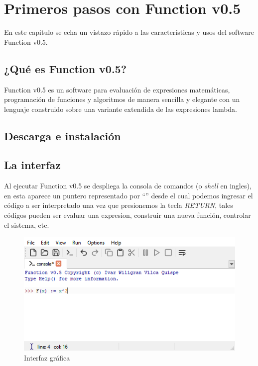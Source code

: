 
\chapter{Primeros pasos con Function v0.5}
   En este capitulo se echa un vistazo rápido a las características y usos del software Function v0.5.
   
   \section{¿Qué es Function v0.5?}
      Function v0.5 es un software para evaluación de expresiones matemáticas, programación de funciones y algoritmos de manera sencilla y elegante con un lenguaje construido sobre una variante extendida de las expresiones lambda.%
      
   \section{Descarga e instalación}
   
   \section{La interfaz}
      Al ejecutar Function v0.5 se despliega la consola de comandos (o {\it shell} en ingles), en esta aparece un puntero representado por ``\arrowprompter'' desde el cual podemos ingresar el código a ser interpretado una vez que presionemos la tecla {\it RETURN}, tales códigos pueden ser evaluar una expresion, construir una nueva función, controlar el sistema, etc. 
   
      \begin{figure}[htbp]
         \caption{Interfaz gráfica}\label{fg:console}
         \begin{center}
            \includegraphics[scale=2.5]{FunctionImg1.png}
         \end{center}   
      \end{figure}
      
